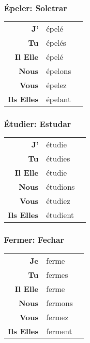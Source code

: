 \documentclass{subfiles}
\begin{document}
\begin{multicols*}{3}
        \subsubsection{Épeler: Soletrar}
            \begin{tabular}{r l r}
                \textbf{J'}        & épelé   &\\
                \textbf{Tu}        & épelés  &\\
                \textbf{Il Elle}   & épelé   &\\
                \textbf{Nous}      & épelons &\\
                \textbf{Vous}      & épelez  &\\
                \textbf{Ils Elles} & épelant &
            \end{tabular}

        \subsubsection{Étudier: Estudar}
            \begin{tabular}{r l r}
                \textbf{J'}        & étudie   &\\
                \textbf{Tu}        & étudies  &\\
                \textbf{Il Elle}   & étudie   &\\
                \textbf{Nous}      & étudions &\\
                \textbf{Vous}      & étudiez  &\\
                \textbf{Ils Elles} & étudient &
            \end{tabular}
    
        \subsubsection{Fermer: Fechar}
            \begin{tabular}{r l r}
                \textbf{Je}        & ferme   &\\
                \textbf{Tu}        & fermes  &\\
                \textbf{Il Elle}   & ferme   &\\
                \textbf{Nous}      & fermons &\\
                \textbf{Vous}      & fermez  &\\
                \textbf{Ils Elles} & ferment &
            \end{tabular}


\end{multicols*}
\end{document}
